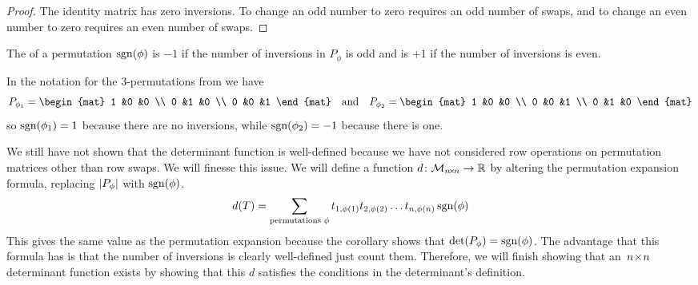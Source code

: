 \begin{proof}
The identity matrix has zero inversions.
To change an odd number to zero requires an odd number of swaps,
and to change an even number to zero requires an even number of swaps.
\end{proof}

\begin{definition}
The %
of a permutation \( \operatorname{sgn}(\phi) \)
is \( -1 \) if the number of inversions in \( P_\phi \) is odd and is
\( +1 \) if the number of inversions is even.
\end{definition}

\begin{example}
In the notation for the $3$-permutations
from  we have
\begin{equation*}
  P_{\phi_1}=
  \begin{mat}
    1  &0  &0  \\
    0  &1  &0  \\
    0  &0  &1
  \end{mat}
  \quad\text{and}\quad
  P_{\phi_2}=
  \begin{mat}
    1  &0  &0  \\
    0  &0  &1  \\
    0  &1  &0  
  \end{mat}
\end{equation*}
so
\( \operatorname{sgn}(\phi_1)=1 \) because there are no inversions, 
while \( \operatorname{sgn}(\phi_2)=-1 \) because there is one.
\end{example}

We still have not shown that the determinant function is
well-defined because we have not considered row operations 
on permutation matrices other than row swaps.
We will finesse this issue.
We will define a function
\( \mbox{$d\colon \mathcal{M}_{n \! \times \! n}\to \mathbb{R}$} \)
by altering the permutation expansion formula, replacing
$\deter{P_\phi}$ with $\operatorname{sgn}(\phi)$.
\begin{equation*}
  d(T)=
  \sum_{\text{permutations\ }\phi}t_{1,\phi(1)}t_{2,\phi(2)}\dots t_{n,\phi(n)}
                                 \operatorname{sgn}(\phi)
\end{equation*}
This gives the same value as the permutation expansion
because the corollary shows that $\det(P_\phi)=\operatorname{sgn}(\phi)$.
The advantage that this formula has is that the number of inversions 
is clearly well-defined \Dash  just count them.
Therefore, we will finish showing that an~$n \! \times \! n$ determinant function 
exists by showing  that this $d$
satisfies the conditions in the determinant's definition.

